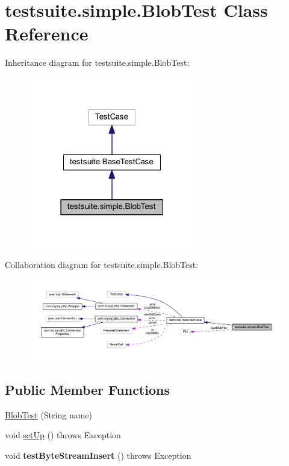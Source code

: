 \hypertarget{classtestsuite_1_1simple_1_1_blob_test}{}\section{testsuite.\+simple.\+Blob\+Test Class Reference}
\label{classtestsuite_1_1simple_1_1_blob_test}


Inheritance diagram for testsuite.\+simple.\+Blob\+Test\+:
\nopagebreak
\begin{figure}[H]
\begin{center}
\leavevmode
\includegraphics[width=207pt]{classtestsuite_1_1simple_1_1_blob_test__inherit__graph}
\end{center}
\end{figure}


Collaboration diagram for testsuite.\+simple.\+Blob\+Test\+:
\nopagebreak
\begin{figure}[H]
\begin{center}
\leavevmode
\includegraphics[width=350pt]{classtestsuite_1_1simple_1_1_blob_test__coll__graph}
\end{center}
\end{figure}
\subsection*{Public Member Functions}
\begin{DoxyCompactItemize}
\item 
\mbox{\hyperlink{classtestsuite_1_1simple_1_1_blob_test_a2741df6da9d07c3c6b8ba36abf15bc86}{Blob\+Test}} (String name)
\item 
void \mbox{\hyperlink{classtestsuite_1_1simple_1_1_blob_test_a81577d1e5c0481dee0a1b3f5638081df}{set\+Up}} ()  throws Exception 
\item 
\mbox{\label{classtestsuite_1_1simple_1_1_blob_test_a2b70339f4974639665b17564cd918834}} 
void {\bfseries test\+Byte\+Stream\+Insert} ()  throws Exception 
\end{DoxyCompactItemize}
